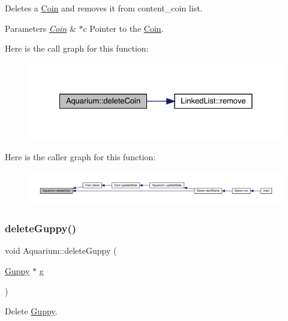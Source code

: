 Deletes a \mbox{\hyperlink{class_coin}{Coin}} and removes it from content\+\_\+coin list. 
\begin{DoxyParams}{Parameters}
{\em \mbox{\hyperlink{class_coin}{Coin}}} & $\ast$c Pointer to the \mbox{\hyperlink{class_coin}{Coin}}. \\
\hline
\end{DoxyParams}
Here is the call graph for this function\+:\nopagebreak
\begin{figure}[H]
\begin{center}
\leavevmode
\includegraphics[width=328pt]{class_aquarium_a187e59dd6efd62b577e97b8e00237c77_cgraph}
\end{center}
\end{figure}
Here is the caller graph for this function\+:\nopagebreak
\begin{figure}[H]
\begin{center}
\leavevmode
\includegraphics[width=350pt]{class_aquarium_a187e59dd6efd62b577e97b8e00237c77_icgraph}
\end{center}
\end{figure}
\mbox{\label{class_aquarium_ae2372aef40d9474573833262b6062eb2}} 
\subsubsection{\texorpdfstring{delete\+Guppy()}{deleteGuppy()}}
{\footnotesize\ttfamily void Aquarium\+::delete\+Guppy (\begin{DoxyParamCaption}\item[{\mbox{\hyperlink{class_guppy}{Guppy}} $\ast$}]{g }\end{DoxyParamCaption})}



Delete \mbox{\hyperlink{class_guppy}{Guppy}}. 

